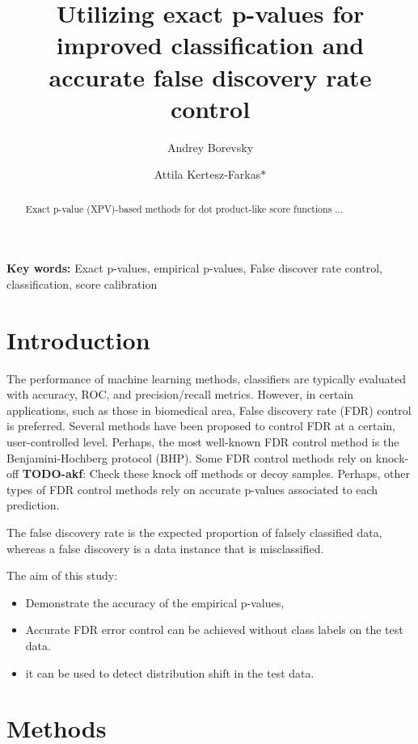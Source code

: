 \documentclass{article}
\author{Andrey Borevsky}
\author{Attila Kertesz-Farkas$\ast$}
\affil{Laboratory on AI for Computational Biology, Faculty of Computer Science, HSE University,  11 Pokrovsky Bvld., Moscow 109028, Russian Federation}
\title{Utilizing exact p-values for improved classification and accurate false discovery rate control}
\newcommand{\todo}[2]{{\color{red} {\bf TODO-#1}: #2}}
\begin{document}
\maketitle

\begin{abstract}
Exact p-value (XPV)-based methods for dot product-like score functions ...


\end{abstract}
\textbf{Key words:} Exact p-values, empirical p-values, False discover rate control, classification, score calibration
\section{Introduction}
The performance of machine learning methods, classifiers are typically evaluated with accuracy, ROC, and precision/recall metrics. However, in certain applications, such as those in biomedical area, False discovery rate (FDR) control is preferred. Several methods have been proposed to control FDR at a certain, user-controlled level. Perhaps, the most well-known FDR control method is the Benjamini-Hochberg protocol (BHP). Some FDR control methods rely on knock-off \todo{akf}{Check these knock off methods} or decoy samples. Perhaps, other types of FDR control methods rely on accurate p-values associated to each prediction.

The false discovery rate is the expected proportion of falsely classified data, whereas a false discovery is a data instance that is misclassified. 

The aim of this study:
\begin{itemize}
	\item Demonstrate the accuracy of the empirical p-values,
	\item Accurate FDR error control can be achieved without class labels on the test data.
	\item it can be used to detect distribution shift in the test data. 
\end{itemize}

\section{Methods}
\end{document}
